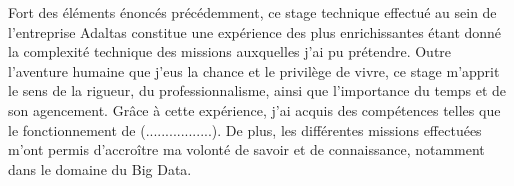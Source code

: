 \documentclass[12pt, french]{report}
\begin{document}
Fort des éléments énoncés précédemment, ce stage technique effectué au sein de l’entreprise Adaltas constitue une expérience des plus enrichissantes étant donné la complexité technique des missions auxquelles j'ai pu prétendre. Outre l’aventure humaine que j’eus la chance et le privilège de vivre, ce stage m’apprit le sens de la rigueur, du professionnalisme, ainsi que l’importance du temps et de son agencement. Grâce à cette expérience, j’ai acquis des compétences telles que le fonctionnement de (.................). De plus, les différentes missions effectuées m’ont permis d’accroître ma volonté de savoir et de connaissance, notamment dans le domaine du Big Data.

\clearpage

\printglossaries
\end{document}
